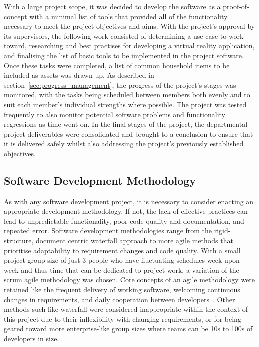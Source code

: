         With a large project scope, it was decided to develop the software as a proof-of-concept with a minimal list of tools that provided all of the functionality necessary to meet the project objectives and aims. With the project's approval by its supervisors, the following work consisted of determining a use case to work toward, researching  and best practises for developing a virtual reality application, and finalising the list of basic tools to be implemented in the project software. Once these tasks were completed, a list of common household items to be included as assets was drawn up. As described in section~\ref{sec:progress_management}, the progress of the project's stages was monitored, with the tasks being scheduled between members both evenly and to suit each member's individual strengths where possible. The project was tested frequently to also monitor potential software problems and functionality regressions as time went on. In the final stages of the project, the departmental project deliverables were consolidated and brought to a conclusion to ensure that it is delivered safely whilst also addressing the project's previously established objectives.

    \subsection{Software Development Methodology}
    
        As with any software development project, it is necessary to consider enacting an appropriate development methodology. If not, the lack of effective practices can lead to unpredictable functionality, poor code quality and documentation, and repeated error. Software development methodologies range from the rigid-structure, document centric waterfall approach to more agile methods that prioritise adaptability to requirement changes and code quality. With a small project group size of just 3 people who have fluctuating schedules week-upon-week and thus time that can be dedicated to project work, a variation of the scrum agile methodology was chosen. Core concepts of an agile methodology were retained like the frequent delivery of working software, welcoming continuous changes in requirements, and daily cooperation between developers~\cite{martin2003agile}. Other methods such like waterfall were considered inappropriate within the context of this project due to their inflexibility with changing requirements, or for being geared toward more enterprise-like group sizes where teams can be 10s to 100s of developers in size.
        
